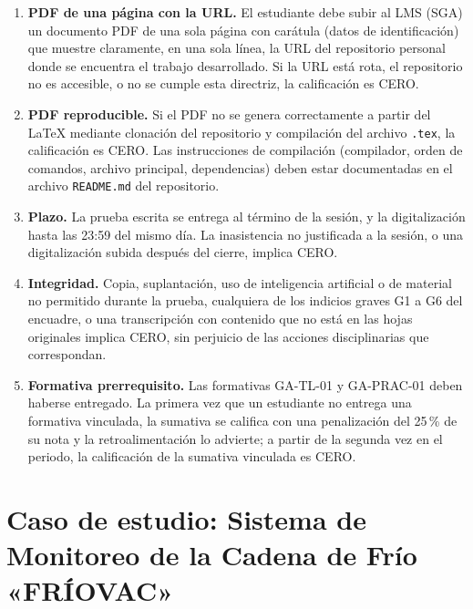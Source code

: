 \documentclass[11pt]{article}
\newcommand{\seccion}[1]{\section{\textcolor{utegreendk}{#1}}}
\begin{document}
\begin{cajapiso}[title={Criterios de piso: el incumplimiento de cualquiera implica calificación 0,0/10}]
	\begin{enumerate}[label=\textbf{P\arabic*.},leftmargin=24pt,itemsep=3pt]
		\item \textbf{PDF de una página con la URL.} El estudiante debe subir al LMS (SGA) un documento PDF de una sola página con carátula (datos de identificación) que muestre claramente, en una sola línea, la URL del repositorio personal donde se encuentra el trabajo desarrollado. Si la URL está rota, el repositorio no es accesible, o no se cumple esta directriz, la calificación es CERO.
		\item \textbf{PDF reproducible.} Si el PDF no se genera correctamente a partir del \LaTeX{} mediante clonación del repositorio y compilación del archivo \texttt{.tex}, la calificación es CERO. Las instrucciones de compilación (compilador, orden de comandos, archivo principal, dependencias) deben estar documentadas en el archivo \texttt{README.md} del repositorio.
		\item \textbf{Plazo.} La prueba escrita se entrega al término de la sesión, y la digitalización hasta las 23:59 del mismo día. La inasistencia no justificada a la sesión, o una digitalización subida después del cierre, implica CERO.
		\item \textbf{Integridad.} Copia, suplantación, uso de inteligencia artificial o de material no permitido durante la prueba, cualquiera de los indicios graves G1 a G6 del encuadre, o una transcripción con contenido que no está en las hojas originales implica CERO, sin perjuicio de las acciones disciplinarias que correspondan.
		\item \textbf{Formativa prerrequisito.} Las formativas GA-TL-01 y GA-PRAC-01 deben haberse entregado. La primera vez que un estudiante no entrega una formativa vinculada, la sumativa se califica con una penalización del 25\,\% de su nota y la retroalimentación lo advierte; a partir de la segunda vez en el periodo, la calificación de la sumativa vinculada es CERO.
	\end{enumerate}
\end{cajapiso}

\seccion{Caso de estudio: Sistema de Monitoreo de la Cadena de Frío «FRÍOVAC»}
\end{document}
